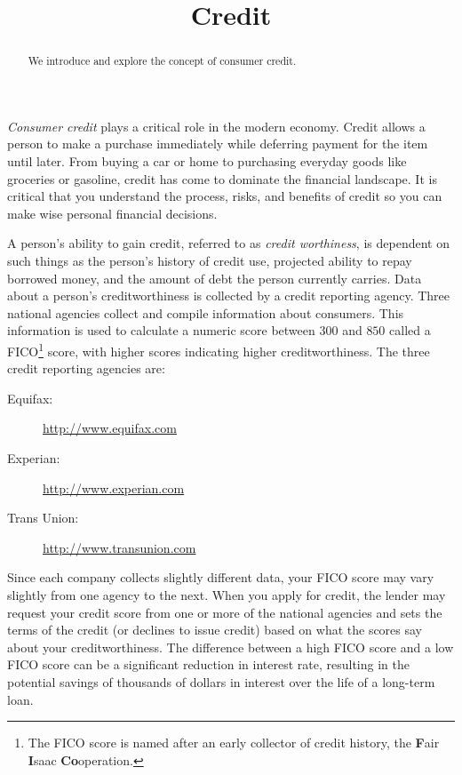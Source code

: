 \documentclass{ximera}
\title{Credit}
\begin{document}
\begin{abstract}
We introduce and explore the concept of consumer credit.
\end{abstract}

\maketitle

\emph{Consumer credit} plays a critical role in the modern economy. Credit allows a person to make a purchase immediately while deferring payment for the item until later. From buying a car or home to purchasing everyday goods like groceries or gasoline, credit has come to dominate the financial landscape. It is critical that you understand the process, risks, and benefits of credit so you can make wise personal financial decisions.

A person's ability to gain credit, referred to as \emph{credit worthiness}, is dependent on such things as the person's history of credit use, projected ability to repay borrowed money, and the amount of debt the person currently carries. Data about a person's creditworthiness is collected by a credit reporting agency. Three national agencies collect and compile information about consumers. This information is used to calculate a numeric score between $300$ and $850$ called a FICO\footnote{The FICO score is named after an early collector of credit history, the \textbf{F}air \textbf{I}saac \textbf{Co}operation.} score, with higher scores indicating higher creditworthiness. The three credit reporting agencies are:
\begin{description}
\item[Equifax:] \href{http://www.equifax.com}{http://www.equifax.com}
\item[Experian:] \href{http://www.experian.com}{http://www.experian.com}
\item[Trans Union:] \href{http://www.transunion.com}{http://www.transunion.com}
\end{description}

Since each company collects slightly different data, your FICO score may vary slightly from one agency to the next.  When you apply for credit, the lender may request your credit score from one or more of the national agencies and sets the terms of the credit (or declines to issue credit) based on what the scores say about your creditworthiness. The difference between a high FICO score and a low FICO score can be a significant reduction in interest rate, resulting in the potential savings of thousands of dollars in interest over the life of a long-term loan.
\end{document}
